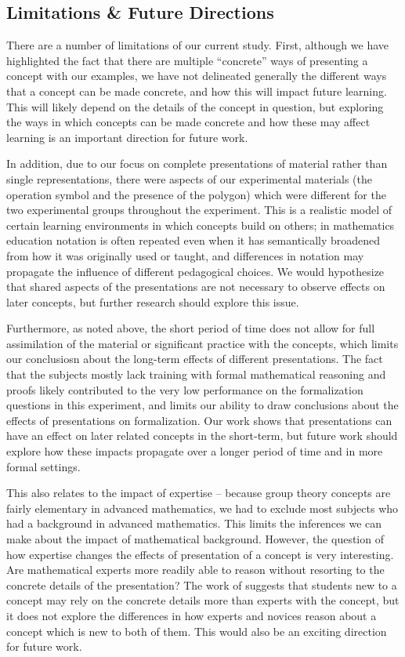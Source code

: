 \documentclass[man,10pt]{apa6}
\begin{document}
\subsection{Limitations \& Future Directions}
There are a number of limitations of our current study. First, although we have highlighted the fact that there are multiple ``concrete'' ways of presenting a concept with our examples, we have not delineated generally the different ways that a concept can be made concrete, and how this will impact future learning. This will likely depend on the details of the concept in question, but exploring the ways in which concepts can be made concrete and how these may affect learning is an important direction for future work.\par
In addition, due to our focus on complete presentations of material rather than single representations, there were aspects of our experimental materials (the operation symbol and the presence of the polygon) which were different for the two experimental groups throughout the experiment. This is a realistic model of certain learning environments in which concepts build on others; in mathematics education notation is often repeated even when it has semantically broadened from how it was originally used or taught, and differences in notation may propagate the influence of different pedagogical choices. We would hypothesize that shared aspects of the presentations are not necessary to observe effects on later concepts, but further research should explore this issue. \par
Furthermore, as noted above, the short period of time does not allow for full assimilation of the material or significant practice with the concepts, which limits our conclusiosn about the long-term effects of different presentations. The fact that the subjects mostly lack training with formal mathematical reasoning and proofs likely contributed to the very low performance on the formalization questions in this experiment, and limits our ability to draw conclusions about the effects of presentations on formalization. Our work shows that presentations can have an effect on later related concepts in the short-term, but future work should explore how these impacts propagate over a longer period of time and in more formal settings. \par
This also relates to the impact of expertise -- because group theory concepts are fairly elementary in advanced mathematics, we had to exclude most subjects who had a background in advanced mathematics. This limits the inferences we can make about the impact of mathematical background. However, the question of how expertise changes the effects of presentation of a concept is very interesting. Are mathematical experts more readily able to reason without resorting to the concrete details of the presentation? The work of  suggests that students new to a concept may rely on the concrete details more than experts with the concept, but it does not explore the differences in how experts and novices reason about a concept which is new to both of them. This would also be an exciting direction for future work.\par
\end{document}
